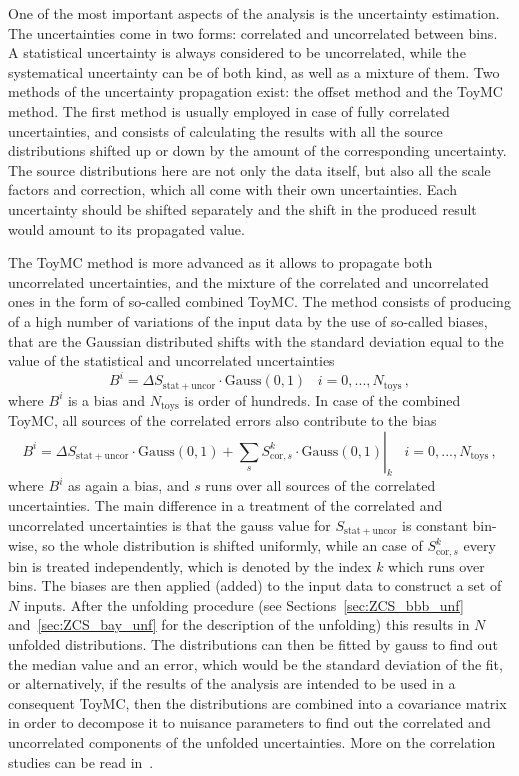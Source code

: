 One of the most important aspects of the analysis is the uncertainty estimation. The uncertainties come in two forms: correlated and uncorrelated between bins. A statistical uncertainty is always considered to be uncorrelated, while the systematical uncertainty can be of both kind, as well as a mixture of them. Two methods of the uncertainty propagation exist: the offset method and the ToyMC method. The first method is usually employed in case of fully correlated uncertainties, and consists of calculating the results with all the source distributions shifted up or down by the amount of the corresponding uncertainty. The source distributions here are not only the data itself, but also all the scale factors and correction, which all come with their own uncertainties. Each uncertainty should be shifted separately and the shift in the produced result would amount to its propagated value.

The ToyMC method is more advanced as it allows to propagate both uncorrelated uncertainties, and the mixture of the correlated and uncorrelated ones in the form of so-called combined ToyMC. The method consists of producing of a high number of variations of the input data by the use of so-called biases, that are the Gaussian distributed shifts with the standard deviation equal to the value of the statistical and uncorrelated uncertainties
\begin{equation}
B^i = \Delta S_\mathrm{stat+uncor} \cdot \mathrm{Gauss}(0,1)\;\;\; i=0,...,N_\mathrm{toys}\,,
\end{equation}
where $B^i$ is a bias and $N_\mathrm{toys}$ is order of hundreds. In case of the combined ToyMC, all sources of the correlated errors also contribute to the bias
\begin{equation}
\left. B^i = \Delta S_\mathrm{stat+uncor} \cdot \mathrm{Gauss}(0,1) + \sum\limits_{s}S^k_{\mathrm{cor},s} \cdot \mathrm{Gauss}(0,1)\right\vert_k \;\;\; i=0,...,N_\mathrm{toys}\,,
\end{equation}
where $B^i$ as again a bias, and $s$ runs over all sources of the correlated uncertainties. The main difference in a treatment of the correlated and uncorrelated uncertainties is that the gauss value for $S_\mathrm{stat+uncor}$ is constant bin-wise, so the whole distribution is shifted uniformly, while an case of $S^k_{\mathrm{cor},s}$ every bin is treated independently, which is denoted by the index $k$ which runs over bins. The biases are then applied (added) to the input data to construct a set of $N$ inputs. After the unfolding procedure (see Sections~\ref{sec:ZCS_bbb_unf} and~\ref{sec:ZCS_bay_unf} for the description of the unfolding) this results in $N$ unfolded distributions. The distributions can then be fitted by gauss to find out the median value and an error, which would be the standard deviation of the fit, or alternatively, if the results of the analysis are intended to be used in a consequent ToyMC, then the distributions are combined into a covariance matrix in order to decompose it to nuisance parameters to find out the correlated and uncorrelated components of the unfolded uncertainties. More on the correlation studies can be read in~\cite{lib:elec_support}.

